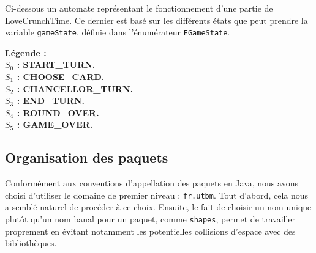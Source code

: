 \documentclass[paper=a4,fontsize=12pt,titlepage]{scrartcl}
\begin{document}
    Ci-dessous un automate représentant le fonctionnement d'une partie de LoveCrunchTime. Ce dernier est basé sur les
    différents états que peut prendre la variable \verb |gameState|, définie dans l'énumérateur \verb|EGameState|.
    \vspace{2 cm}

    \begin{center}

    \textbf{Légende :\\
        $S_0$ : START\_TURN.\\
        $S_1$ : CHOOSE\_CARD.\\
        $S_2$ : CHANCELLOR\_TURN.\\
        $S_3$ : END\_TURN.\\
        $S_4$ : ROUND\_OVER.\\
        $S_5$ : GAME\_OVER.}

    \end{center}

    \newpage
    \subsection{Organisation des paquets}\label{subsec:organisation-des-paquets}
    Conformément aux conventions d'appellation des paquets en Java, nous avons choisi d'utiliser le domaine de premier niveau :
    \verb|fr.utbm|. Tout d'abord, cela nous a semblé naturel de procéder à ce choix. Ensuite, le fait de choisir un nom unique
    plutôt qu'un nom banal pour un paquet, comme \verb|shapes|, permet de travailler proprement en évitant notamment les
    potentielles collisions d'espace avec des bibliothèques.
\end{document}
